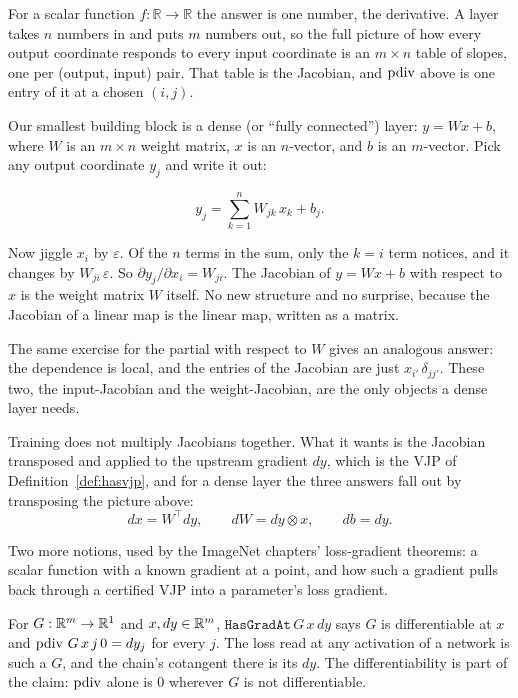 For a scalar function \(f : \mathbb{R} \to \mathbb{R}\) the answer is
one number, the derivative. A layer takes \(n\) numbers in and puts
\(m\) numbers out, so the full picture of how every output coordinate
responds to every input coordinate is an \(m \times n\) table of slopes,
one per (output, input) pair. That table is the Jacobian, and
\(\operatorname{pdiv}\) above is one entry of it at a chosen \((i, j)\).

Our smallest building block is a dense (or ``fully connected'')
layer: \(y = Wx + b\), where \(W\) is an \(m \times n\) weight
matrix, \(x\) is an \(n\)-vector, and \(b\) is an \(m\)-vector.
Pick any output coordinate \(y_j\) and write it out:

\[
y_j = \sum_{k=1}^{n} W_{jk}\, x_k + b_j.
\]

Now jiggle \(x_i\) by \(\varepsilon\). Of the \(n\) terms in the
sum, only the \(k = i\) term notices, and it changes by
\(W_{ji}\,\varepsilon\). So \(\partial y_j / \partial x_i = W_{ji}\).
The Jacobian of \(y = Wx + b\) with respect to \(x\) is the
weight matrix \(W\) itself. No new structure and no surprise, because the
Jacobian of a linear map is the linear map, written as a matrix.

The same exercise for the partial with respect to \(W\) gives an
analogous answer: the dependence is local, and the entries of the
Jacobian are just \(x_{i'}\, \delta_{jj'}\). These two, the
input-Jacobian and the weight-Jacobian, are the only objects a dense
layer needs.

Training does not multiply Jacobians together. What it wants is the
Jacobian transposed and applied to the upstream gradient \(dy\), which
is the VJP of Definition~\ref{def:hasvjp}, and for a dense layer the
three answers fall out by transposing the picture above:
\[
  dx = W^\top dy, \qquad dW = dy \otimes x, \qquad db = dy.
\]

Two more notions, used by the ImageNet chapters' loss-gradient theorems: a
scalar function with a known gradient at a point, and how such a gradient
pulls back through a certified VJP into a parameter's loss gradient.

\begin{definition}
  \label{def:hasgradat}
  \leanok
  For \(G : \mathbb{R}^{m} \to \mathbb{R}^{1}\) and \(x, dy \in \mathbb{R}^{m}\),
  \(\texttt{HasGradAt}\, G\, x\, dy\) says \(G\) is differentiable at \(x\)
  and \(\operatorname{pdiv}\, G\, x\, j\, 0 = dy_j\) for every \(j\). The loss read at any
  activation of a network is such a \(G\), and the chain's cotangent there is
  its \(dy\). The differentiability is part of the claim: \(\operatorname{pdiv}\) alone is
  \(0\) wherever \(G\) is not differentiable.
\end{definition}

